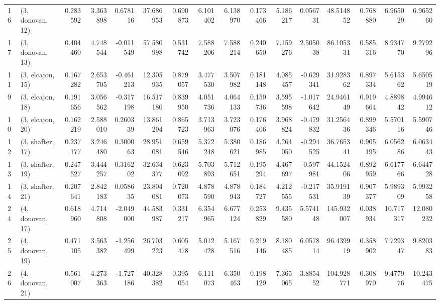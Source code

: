 \begin{tabular}{llrrrrrrrrrrrrrr}
16 &  (3, donovan, 12) &   0.283592 &  3.363898 &  0.678116 &  37.686953 &  0.690873 &   6.101402 &  6.138970 &  0.173466 &   5.186217 &  0.056731 &   48.514852 &  0.768880 &   6.965029 &   6.965260 \\
17 &  (3, donovan, 13) &   0.404460 &  4.748544 & -0.011549 &  57.580998 &  0.531742 &   7.588206 &  7.588214 &  0.240650 &   7.159276 &  2.505038 &   86.105331 &  0.585316 &   8.934770 &   9.279296 \\
11 &  (3, elcajon, 15) &   0.167282 &  2.653705 & -0.461213 &  12.305935 &  0.879057 &   3.477530 &  3.507982 &  0.181148 &   4.085457 & -0.629341 &   31.928362 &  0.897334 &   5.615362 &   5.650519 \\
9  &  (3, elcajon, 18) &   0.191656 &  3.056562 & -0.317198 &  16.517180 &  0.839950 &   4.051736 &  4.064133 &  0.159736 &   3.595598 & -1.017642 &   24.946149 &  0.919664 &   4.889842 &   4.994612 \\
10 &  (3, elcajon, 20) &   0.162219 &  2.588010 &  0.260339 &  13.861294 &  0.865723 &   3.713963 &  3.723076 &  0.176406 &   3.968824 & -0.479832 &   31.256436 &  0.899346 &   5.570116 &   5.590746 \\
12 &  (3, shafter, 17) &   0.237177 &  3.246480 &  0.300063 &  28.951081 &  0.659546 &   5.372248 &  5.380621 &  0.186985 &   4.264050 & -0.294525 &   36.765341 &  0.905195 &   6.056286 &   6.063443 \\
13 &  (3, shafter, 19) &   0.247527 &  3.444257 &  0.316202 &  32.634377 &  0.623092 &   5.703893 &  5.712651 &  0.195294 &   4.467697 & -0.597981 &   44.152406 &  0.892959 &   6.617766 &   6.644728 \\
14 &  (3, shafter, 21) &   0.207641 &  2.842183 &  0.058635 &  23.804081 &  0.720073 &   4.878590 &  4.878943 &  0.184727 &   4.212555 & -0.217531 &   35.919139 &  0.907377 &   5.989309 &   5.993258 \\
24 &  (4, donovan, 17) &   0.618960 &  4.714808 & -2.049000 &  44.583987 &  0.331217 &   6.354965 &  6.677124 &  0.253829 &   9.435580 &  5.574148 &  145.932007 &  0.038934 &  10.717317 &  12.080232 \\
25 &  (4, donovan, 19) &   0.471105 &  3.563382 & -1.256499 &  26.703223 &  0.605478 &   5.012428 &  5.167516 &  0.219146 &   8.180485 &  6.057814 &   96.439919 &  0.358902 &   7.729347 &   9.820383 \\
26 &  (4, donovan, 21) &   0.561007 &  4.273363 & -1.727186 &  40.328382 &  0.395054 &   6.111073 &  6.350463 &  0.198129 &   7.365065 &  3.885452 &  104.928771 &  0.308970 &   9.477976 &  10.243475 \\

\end{tabular}
